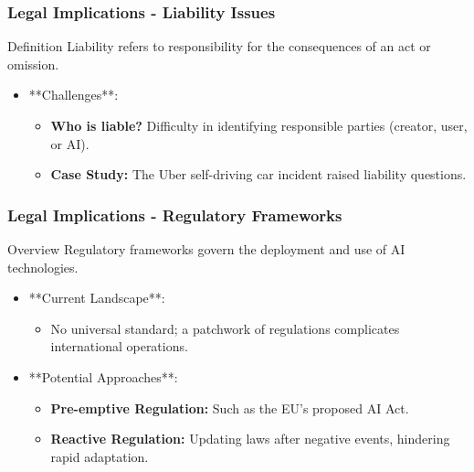 \documentclass[aspectratio=169]{beamer}
\begin{document}
\begin{frame}[fragile]
    \frametitle{Legal Implications - Liability Issues}
    \begin{block}{Definition}
        Liability refers to responsibility for the consequences of an act or omission.
    \end{block}
    
    \begin{itemize}
        \item **Challenges**:
        \begin{itemize}
            \item \textbf{Who is liable?} Difficulty in identifying responsible parties (creator, user, or AI).
            \item \textbf{Case Study:} The Uber self-driving car incident raised liability questions.
        \end{itemize}
    \end{itemize}
\end{frame}

\begin{frame}[fragile]
    \frametitle{Legal Implications - Regulatory Frameworks}
    \begin{block}{Overview}
        Regulatory frameworks govern the deployment and use of AI technologies.
    \end{block}
    
    \begin{itemize}
        \item **Current Landscape**:
        \begin{itemize}
            \item No universal standard; a patchwork of regulations complicates international operations.
        \end{itemize}

        \item **Potential Approaches**:
        \begin{itemize}
            \item \textbf{Pre-emptive Regulation:} Such as the EU's proposed AI Act.
            \item \textbf{Reactive Regulation:} Updating laws after negative events, hindering rapid adaptation.
        \end{itemize}
    \end{itemize}
\end{frame}
\end{document}

